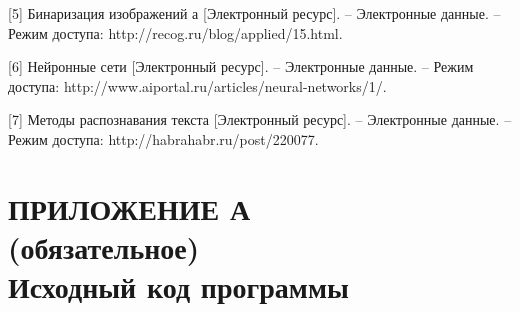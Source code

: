 \documentclass[14pt,a4paper]{extreport}
\begin{document}
\hspace{4ex}[5] Бинаризация изображений а [Электронный ресурс]. – Электронные данные. – Режим доступа: http://recog.ru/blog/applied/15.html.\

\hspace{4ex}[6] Нейронные сети [Электронный ресурс]. – Электронные данные. – Режим доступа: http://www.aiportal.ru/articles/neural-networks/1/.\

\hspace{4ex}[7] Методы распознавания текста [Электронный ресурс]. – Электронные данные. – Режим доступа: http://habrahabr.ru/post/220077.\






	
	\newpage
	\section*{\center\normalsize ПРИЛОЖЕНИЕ А\\(обязательное)\\Исходный код программы \endcenter}
	
\end{document}
